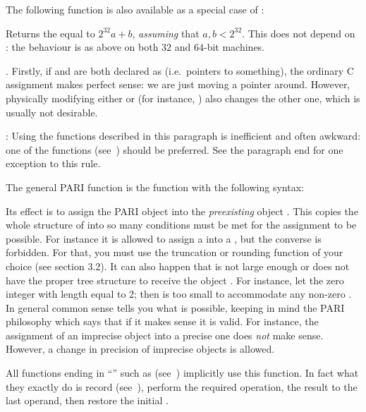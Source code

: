 \noindent The following function is also available as a special case of
:


Returns the  equal to $2^{32} a + b$, \emph{assuming} that
$a,b < 2^{32}$. This does not depend on : the behaviour is
as above on both $32$ and $64$-bit machines.

.
Firstly, if  and  are both declared as  (i.e.~pointers
to something), the ordinary C assignment  makes perfect sense: we
are just moving a pointer around. However, physically modifying either
 or  (for instance, ) also changes the other
one, which is usually not desirable. \label{se:assign}

: Using the functions described in this
paragraph is inefficient and often awkward: one of the 
functions (see~) should be preferred. See the paragraph
end for one exception to this rule.

\noindent
The general PARI  function is the function  with
the following syntax:


\noindent
Its effect is to assign the PARI object  into the \emph{preexisting}
object . This copies the whole structure of  into  so
many conditions must be met for the assignment to be possible. For instance
it is allowed to assign a  into a , but the converse is
forbidden. For that, you must use the truncation or rounding function of
your choice (see section 3.2). It can also happen that  is not large
enough or does not have the proper tree structure to receive the object
. For instance, let  the zero integer with length equal to 2;
then  is too small to accommodate any non-zero . In general
common sense tells you what is possible, keeping in mind the PARI
philosophy which says that if it makes sense it is valid. For instance, the
assignment of an imprecise object into a precise one does \emph{not} make
sense. However, a change in precision of imprecise objects is allowed.

All functions ending in ``'' such as 
(see~) implicitly use this function. In fact what they
exactly do is record {} (see~), perform the
required operation,  the result to the last operand, then
restore the initial .

